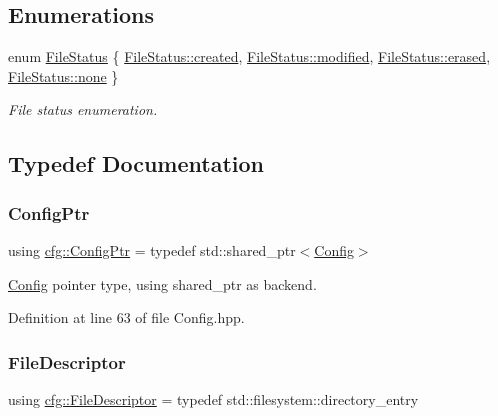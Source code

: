 \subsection*{Enumerations}
\begin{DoxyCompactItemize}
\item 
enum \hyperlink{namespacecfg_a384f743959a9029f7e1c3d11548795de}{File\+Status} \{ \hyperlink{namespacecfg_a384f743959a9029f7e1c3d11548795deae2fa538867c3830a859a5b17ab24644b}{File\+Status\+::created}, 
\hyperlink{namespacecfg_a384f743959a9029f7e1c3d11548795dea9ae73c65f418e6f79ceb4f0e4a4b98d5}{File\+Status\+::modified}, 
\hyperlink{namespacecfg_a384f743959a9029f7e1c3d11548795deaf4adee3fff79c6ddad5b2e45f730006a}{File\+Status\+::erased}, 
\hyperlink{namespacecfg_a384f743959a9029f7e1c3d11548795dea334c4a4c42fdb79d7ebc3e73b517e6f8}{File\+Status\+::none}
 \}\begin{DoxyCompactList}\small\item\em File status enumeration. \end{DoxyCompactList}
\end{DoxyCompactItemize}


\subsection{Typedef Documentation}
\mbox{\label{namespacecfg_af5f3a3fc2010c76e90bc66696485989f}} 
\subsubsection{\texorpdfstring{Config\+Ptr}{ConfigPtr}}
{\footnotesize\ttfamily using \hyperlink{namespacecfg_af5f3a3fc2010c76e90bc66696485989f}{cfg\+::\+Config\+Ptr} = typedef std\+::shared\+\_\+ptr$<$\hyperlink{classcfg_1_1_config}{Config}$>$}



\hyperlink{classcfg_1_1_config}{Config} pointer type, using shared\+\_\+ptr as backend. 



Definition at line 63 of file Config.\+hpp.

\mbox{\label{namespacecfg_af0aed6e47bd26e91ad7d69467f96caaf}} 
\subsubsection{\texorpdfstring{File\+Descriptor}{FileDescriptor}}
{\footnotesize\ttfamily using \hyperlink{namespacecfg_af0aed6e47bd26e91ad7d69467f96caaf}{cfg\+::\+File\+Descriptor} = typedef std\+::filesystem\+::directory\+\_\+entry}



